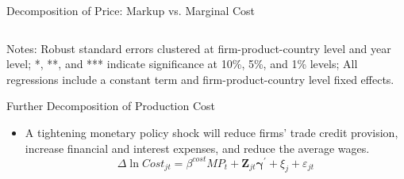 \documentclass[10pt]{beamer}
\begin{document}
\begin{frame}{Decomposition of Price: Markup vs. Marginal Cost}
\begin{table}[htbp]
{\begin{threeparttable}
\begin{tabular}{lcccc}
                \bottomrule
            \end{tabular}
            \begin{tablenotes}
                \footnotesize
                \item Notes: Robust standard errors clustered at firm-product-country level and year level;  *, **, and *** indicate significance at 10\%, 5\%, and 1\% levels; All regressions include a constant term and firm-product-country level fixed effects.
            \end{tablenotes}
        \end{threeparttable}
        }
	\label{tab.markup}
    \end{table}
\end{frame}

\begin{frame}{Further Decomposition of Production Cost}
    \begin{itemize}
        \item A tightening monetary policy shock will reduce firms' trade credit provision, increase financial and interest expenses, and reduce the average wages.
        \begin{equation}
            \Delta \ln Cost_{jt}=\beta^{cost} M P_{t} + \mathbf{Z}_{jt} \boldsymbol{\gamma}^{\prime} +\xi_{j} + \varepsilon_{jt}
    	\label{eq.mc}
        \end{equation}
    \end{itemize}
        \begin{table}[htbp]
        \centering  
        \vspace{-5mm}
        \caption{Effect of US monetary policy shocks on firm-level cost variables}
\end{table}
\end{frame}
\end{document}
